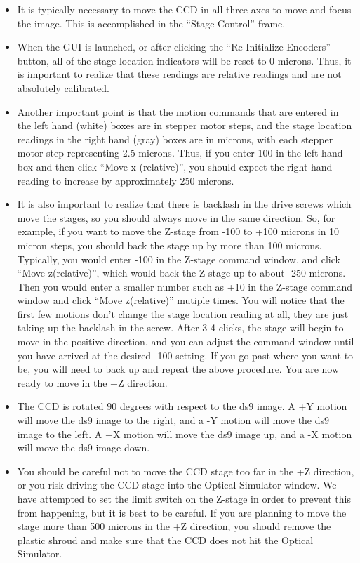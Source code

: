 \documentclass{article} %
\makeatletter
\def\section{\@startsection {section}{1}{\z@}{1.0ex plus
1ex minus .2ex}{.2ex plus .2ex}{\large\bf}}
\makeatother
\begin{document}
\section{Moving the Stage}
\begin{itemize}
  \item It is typically necessary to move the CCD in all three axes to move and focus the image.  This is accomplished in the ``Stage Control'' frame.
  \item When the GUI is launched, or after clicking the ``Re-Initialize Encoders'' button, all of the stage location indicators will be reset to 0 microns.  Thus, it is important to realize that these readings are relative readings and are not absolutely calibrated.
  \item Another important point is that the motion commands that are entered in the left hand (white) boxes are in stepper motor steps, and the stage location readings in the right hand (gray) boxes are in microns, with each stepper motor step representing 2.5 microns.  Thus, if you enter 100 in the left hand box and then click ``Move x (relative)'', you should expect the right hand reading to increase by approximately 250 microns.
  \item It is also important to realize that there is backlash in the drive screws which move the stages, so you should always move in the same direction.  So, for example, if you want to move the Z-stage from -100 to +100 microns in 10 micron steps, you should back the stage up by more than 100 microns.  Typically, you would enter -100 in the Z-stage command window, and click ``Move z(relative)'', which would back the Z-stage up to about -250 microns.  Then you would enter a smaller number such as +10 in the Z-stage command window and click ``Move z(relative)'' mutiple times. You will notice that the first few motions don't change the stage location reading at all, they are just taking up the backlash in the screw.  After 3-4 clicks, the stage will begin to move in the positive direction, and you can adjust the command window until you have arrived at the desired -100 setting.  If you go past where you want to be, you will need to back up and repeat the above procedure.  You are now ready to move in the +Z direction.
  \item The CCD is rotated 90 degrees with respect to the ds9 image.  A +Y motion will move the ds9 image to the right, and a -Y motion will move the ds9 image to the left.  A +X motion will move the ds9 image up, and a -X motion will move the ds9 image down.
  \item You should be careful not to move the CCD stage too far in the +Z direction, or you risk driving the CCD stage into the Optical Simulator window.  We have attempted to set the limit switch on the Z-stage in order to prevent this from happening, but it is best to be careful. If you are planning to move the stage more than 500 microns in the +Z direction, you should remove the plastic shroud and make sure that the CCD does not hit the Optical Simulator.
\end{itemize}
\end{document}
